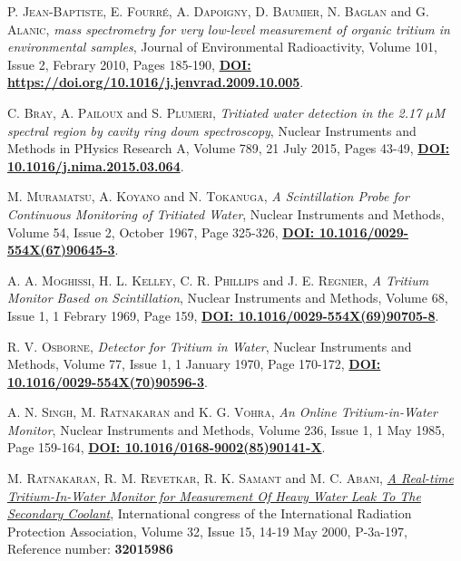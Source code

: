 \begin{thebibliography}{100}
 \textsc{P. Jean-Baptiste}, \textsc{E. Fourré}, \textsc{A. Dapoigny}, \textsc{D. Baumier}, \textsc{N. Baglan} and \textsc{G. Alanic},
\textit{ mass spectrometry for very low-level measurement of organic tritium in environmental samples}, Journal of Environmental Radioactivity, Volume 101, Issue 2, Febrary 2010, Pages 185-190, \href{https://doi.org/10.1016/j.jenvrad.2009.10.005}{\textbf{DOI: https://doi.org/10.1016/j.jenvrad.2009.10.005}}. 

 \textsc{C. Bray}, \textsc{A. Pailoux} and \textsc{S. Plumeri},
\textit{Tritiated water detection in the 2.17 $\mu$M spectral region by cavity ring down spectroscopy},  Nuclear Instruments and Methods in PHysics Research A, Volume 789, 21 July 2015, Pages 43-49, \href{https://doi.org/10.1016/j.nima.2015.03.064}{\textbf{DOI: 10.1016/j.nima.2015.03.064}}. 

 \textsc{M. Muramatsu}, \textsc{A. Koyano} and \textsc{N. Tokanuga},
\textit{A Scintillation Probe for Continuous Monitoring of Tritiated Water}, Nuclear Instruments and Methods, Volume 54, Issue 2, October 1967, Page 325-326, \href{https://doi.org/10.1016/0029-554X(67)90645-3}{\textbf{DOI: 10.1016/0029-554X(67)90645-3}}.

 \textsc{A. A. Moghissi}, \textsc{H. L. Kelley}, \textsc{C. R. Phillips} and \textsc{J. E. Regnier},
\textit{A Tritium Monitor Based on Scintillation}, Nuclear Instruments and Methods, Volume 68, Issue 1, 1 Febrary 1969, Page 159, \href{https://doi.org/10.1016/0029-554X(69)90705-8}{\textbf{DOI: 10.1016/0029-554X(69)90705-8}}.

 \textsc{R. V. Osborne},
\textit{Detector for Tritium in Water}, Nuclear Instruments and Methods, Volume 77, Issue 1, 1 January 1970, Page 170-172, \href{https://doi.org/10.1016/0029-554X(70)90596-3}{\textbf{DOI: 10.1016/0029-554X(70)90596-3}}.

 \textsc{A. N. Singh}, \textsc{M. Ratnakaran} and \textsc{K. G. Vohra},
\textit{An Online Tritium-in-Water Monitor}, Nuclear Instruments and Methods, Volume 236, Issue 1, 1 May 1985, Page 159-164, \href{https://doi.org/10.1016/0168-9002(85)90141-X}{\textbf{DOI: 10.1016/0168-9002(85)90141-X}}.

 \textsc{M. Ratnakaran}, \textsc{R. M. Revetkar}, \textsc{R. K. Samant} and \textsc{M. C. Abani},
\href{https://inis.iaea.org/search/search.aspx?orig_q=RN:32015986}{\textit{A Real-time Tritium-In-Water Monitor for Measurement Of Heavy Water Leak To The Secondary Coolant}}, International congress of the International Radiation Protection Association, Volume 32, Issue 15, 14-19 May 2000, P-3a-197, Reference number: \textbf{32015986}


\end{thebibliography}
